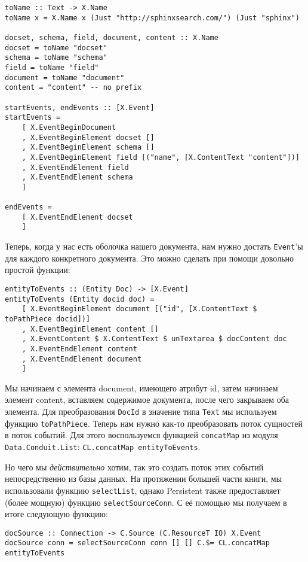 \begin{lstlisting}
toName :: Text -> X.Name
toName x = X.Name x (Just "http://sphinxsearch.com/") (Just "sphinx")

docset, schema, field, document, content :: X.Name
docset = toName "docset"
schema = toName "schema"
field = toName "field"
document = toName "document"
content = "content" -- no prefix

startEvents, endEvents :: [X.Event]
startEvents =
    [ X.EventBeginDocument
    , X.EventBeginElement docset []
    , X.EventBeginElement schema []
    , X.EventBeginElement field [("name", [X.ContentText "content"])]
    , X.EventEndElement field
    , X.EventEndElement schema
    ]

endEvents =
    [ X.EventEndElement docset
    ]
\end{lstlisting}

Теперь, когда у нас есть оболочка нашего документа, нам нужно достать \lstinline!Event!'ы для каждого конкретного документа. Это можно сделать при помощи довольно простой функции:

\begin{lstlisting}
entityToEvents :: (Entity Doc) -> [X.Event]
entityToEvents (Entity docid doc) =
    [ X.EventBeginElement document [("id", [X.ContentText $ toPathPiece docid])]
    , X.EventBeginElement content []
    , X.EventContent $ X.ContentText $ unTextarea $ docContent doc
    , X.EventEndElement content
    , X.EventEndElement document
    ]
\end{lstlisting}
Мы начинаем с элемента document, имеющего атрибут id, затем начинаем элемент content, вставляем содержимое документа, после чего закрываем оба элемента. Для преобразования \lstinline!DocId! в значение типа \lstinline!Text! мы используем функцию \lstinline!toPathPiece!. Теперь нам нужно как-то преобразовать поток сущностей в поток событий. Для этого воспользуемся функцией \lstinline!concatMap! из модуля \lstinline!Data.Conduit.List!: \lstinline`CL.concatMap entityToEvents`.

Но чего мы \emph{действительно} хотим, так это создать поток этих событий непосредственно из базы данных. На протяжении большей части книги, мы использовали функцию \lstinline!selectList!, однако Persistent также предоставляет (более мощную) функцию \lstinline!selectSourceConn!. С её помощью мы получаем в итоге следующую функцию: %

\begin{lstlisting}
docSource :: Connection -> C.Source (C.ResourceT IO) X.Event
docSource conn = selectSourceConn conn [] [] C.$= CL.concatMap entityToEvents
\end{lstlisting}%

